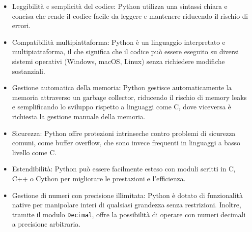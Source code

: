 \begin{itemize}
    \item Leggibilità e semplicità del codice: Python utilizza una sintassi 
    chiara e concisa che rende il codice facile da leggere e mantenere riducendo 
    il rischio di errori.
    \item Compatibilità multipiattaforma: Python è un linguaggio interpretato e 
    multipiattaforma, il che significa che il codice può essere eseguito su diversi 
    sistemi operativi (Windows, macOS, Linux) senza richiedere modifiche sostanziali.
    \item Gestione automatica della memoria: Python gestisce automaticamente la memoria 
    attraverso un garbage collector, riducendo il rischio di memory leaks e semplificando 
    lo sviluppo rispetto a linguaggi come C, dove viceversa è richiesta la gestione manuale della memoria.
    \item Sicurezza: Python offre protezioni intrinseche contro problemi di sicurezza 
    comuni, come buffer overflow, che sono invece frequenti in linguaggi a basso livello come C.
    \item Estendibilità: Python può essere facilmente esteso con moduli 
    scritti in C, C++ o Cython per migliorare le prestazioni e l'efficienza. 
    \item Gestione di numeri con precisione illimitata: Python è dotato di funzionalità 
    native per manipolare interi di qualsiasi grandezza senza restrizioni. Inoltre, 
    tramite il modulo \texttt{Decimal}, offre la possibilità di operare con numeri 
    decimali a precisione arbitraria. 
\end{itemize}

